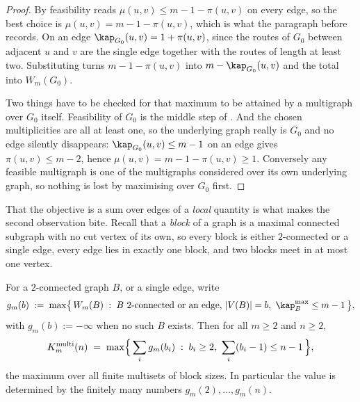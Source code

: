 \begin{proof}
By  feasibility reads $\mu(u,v) \le m-1-\pi(u,v)$ on every edge, so the best choice is $\mu(u,v) = m-1-\pi(u,v)$, which is what the paragraph before  records. On an edge $\kap_{G_0}(u,v) = 1 + \pi(u,v)$, since the routes of $G_0$ between adjacent $u$ and $v$ are the single edge together with the routes of length at least two. Substituting turns $m-1-\pi(u,v)$ into $m - \kap_{G_0}(u,v)$ and the total into $W_m(G_0)$.

Two things have to be checked for that maximum to be attained by a multigraph over $G_0$ itself. Feasibility of $G_0$ is the middle step of . And the chosen multiplicities are all at least one, so the underlying graph really is $G_0$ and no edge silently disappears: $\kap_{G_0}(u,v) \le m-1$ on an edge gives $\pi(u,v) \le m-2$, hence $\mu(u,v) = m-1-\pi(u,v) \ge 1$. Conversely any feasible multigraph is one of the multigraphs considered over its own underlying graph, so nothing is lost by maximising over $G_0$ first.
\end{proof}

That the objective is a sum over edges of a \emph{local} quantity is what makes the second observation bite. Recall that a \emph{block} of a graph is a maximal connected subgraph with no cut vertex of its own, so every block is either $2$-connected or a single edge, every edge lies in exactly one block, and two blocks meet in at most one vertex.

\begin{theorem}\label{thm:multi-vertex-blocks}
For a $2$-connected graph $B$, or a single edge, write
\[
    g_m(b) \;:=\; \max\bigl\{\, W_m(B) \;:\; B \text{ $2$-connected or an edge, } |V(B)| = b,\ \kap^{\max}_B \le m-1 \,\bigr\} ,
\]
with $g_m(b) := -\infty$ when no such $B$ exists. Then for all $m \ge 2$ and $n \ge 2$,
\[
    K_m^{\mathrm{multi}}(n)
    \;=\; \max\Bigl\{\, \sum_{i} g_m(b_i) \;:\; b_i \ge 2,\ \sum_i (b_i - 1) \le n-1 \,\Bigr\} ,
\]
the maximum over all finite multisets of block sizes. In particular the value is determined by the finitely many numbers $g_m(2), \dots, g_m(n)$.
\end{theorem}

